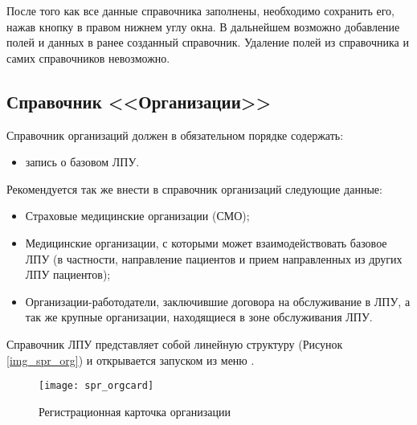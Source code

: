 После того как все данные справочника заполнены, необходимо сохранить его, нажав кнопку  в правом нижнем углу окна. В дальнейшем возможно добавление полей и данных в ранее созданный справочник. Удаление полей из справочника и самих справочников невозможно. 
 
\subsection{Справочник <<Организации>>}

Справочник организаций должен в обязательном порядке содержать:
\begin{itemize}
 \item 	запись о базовом ЛПУ.
\end{itemize}

Рекомендуется так же внести в справочник организаций следующие данные:
\begin{itemize}
 \item Страховые медицинские организации (СМО);
 \item Медицинские организации, с которыми может взаимодействовать базовое ЛПУ (в частности, направление пациентов и прием направленных из других ЛПУ пациентов);
 \item Организации-работодатели, заключившие договора на обслуживание в ЛПУ, а так же крупные организации, находящиеся в зоне обслуживания ЛПУ.
\end{itemize}

Справочник ЛПУ представляет собой линейную структуру (Рисунок \ref{img_spr_org}) и открывается запуском из меню .
 
\begin{figure}[ht]\centering
 \texttt{[image: spr\_orgcard]}
 \caption{Регистрационная карточка организации}
 \label{img_spr_orgcard}
\end{figure} 

